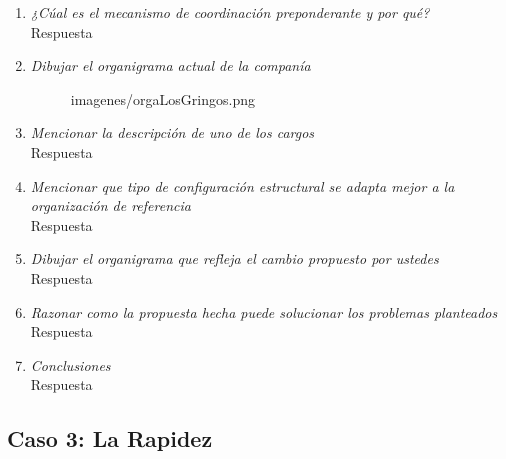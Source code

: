 \documentclass[a4paper,10pt]{article}
\begin{document}
\begin{enumerate}
			\item \textit{¿Cúal es el mecanismo de coordinación preponderante y por qué?}\\
			Respuesta
						
			\item \textit{Dibujar el organigrama actual de la companía}\\
			\begin{figure}[!h]
			\caption[width=0.15\textwidth]{imagenes/orgaLosGringos.png}
			\end{figure}
			\newpage			
			\item \textit{Mencionar la descripción de uno de los cargos}\\
			Respuesta
						
			\item \textit{Mencionar que tipo de configuración estructural se adapta mejor a la organización de referencia}\\
			Respuesta
						
			\item \textit{Dibujar el organigrama que refleja el cambio propuesto por ustedes}\\
			Respuesta
						
			\item \textit{Razonar como la propuesta hecha puede solucionar los problemas planteados}\\
			Respuesta
			
			\item \textit{Conclusiones}\\
			Respuesta
			
			\end{enumerate}
		
	\subsection{Caso 3: La Rapidez}
\end{document}
